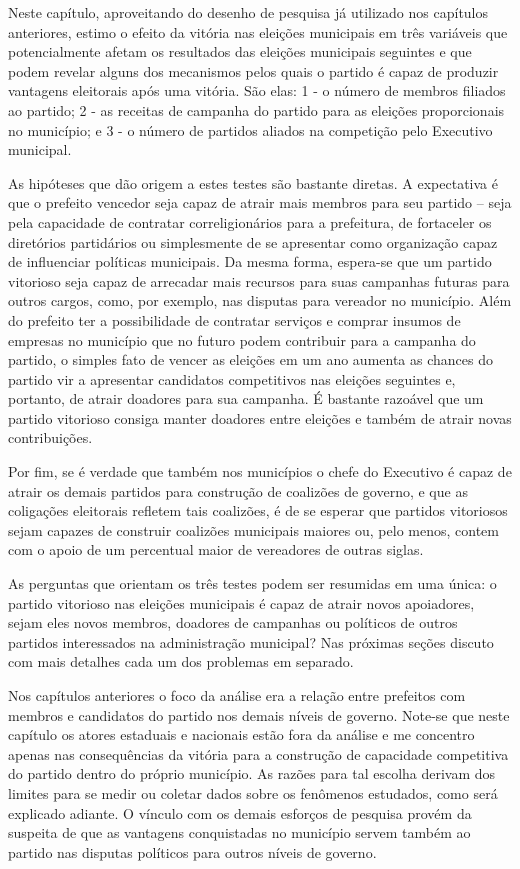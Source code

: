 Neste capítulo, aproveitando do desenho de pesquisa já utilizado nos capítulos anteriores, estimo o efeito da vitória nas eleições municipais em três variáveis que potencialmente afetam os resultados das eleições municipais seguintes e que podem revelar alguns dos mecanismos pelos quais o partido é capaz de produzir vantagens eleitorais após uma vitória. São elas: 1 - o número de membros filiados ao partido; 2 - as receitas de campanha do partido para as eleições proporcionais no município; e 3 - o número de partidos aliados na competição pelo Executivo municipal. 

As hipóteses que dão origem a estes testes são bastante diretas. A expectativa é que o prefeito vencedor seja capaz de atrair mais membros para seu partido -- seja pela capacidade de contratar correligionários para a prefeitura, de fortaceler os diretórios partidários ou simplesmente de se apresentar como organização capaz de influenciar políticas municipais. Da mesma forma, espera-se que um partido vitorioso seja capaz de arrecadar mais recursos para suas campanhas futuras para outros cargos, como, por exemplo, nas disputas para vereador no município. Além do prefeito ter a possibilidade de contratar serviços e comprar insumos de empresas no município que no futuro podem contribuir para a campanha do partido, o simples fato de vencer as eleições em um ano aumenta as chances do partido vir a apresentar candidatos competitivos nas eleições seguintes e, portanto, de atrair doadores para sua campanha. É bastante razoável que um partido vitorioso consiga manter doadores entre eleições e também de atrair novas contribuições.

Por fim, se é verdade que também nos municípios o chefe do Executivo é capaz de atrair os demais partidos para construção de coalizões de governo, e que as coligações eleitorais refletem tais coalizões, é de se esperar que partidos vitoriosos sejam capazes de construir coalizões municipais maiores ou, pelo menos, contem com o apoio de um percentual maior de vereadores de outras siglas.

As perguntas que orientam os três testes podem ser resumidas em uma única: o partido vitorioso nas eleições municipais é capaz de atrair novos apoiadores, sejam eles novos membros, doadores de campanhas ou políticos de outros partidos interessados na administração municipal? Nas próximas seções discuto com mais detalhes cada um dos problemas em separado.

Nos capítulos anteriores o foco da análise era a relação entre prefeitos com membros e candidatos do partido nos demais níveis de governo. Note-se que neste capítulo os atores estaduais e nacionais estão fora da análise e me concentro apenas nas consequências da vitória para a construção de capacidade competitiva do partido dentro do próprio município. As razões para tal escolha derivam dos limites para se medir ou coletar dados sobre os fenômenos estudados, como será explicado adiante. O vínculo com os demais esforços de pesquisa provém da suspeita de que as vantagens conquistadas no município servem também ao partido nas disputas políticos para outros níveis de governo.

